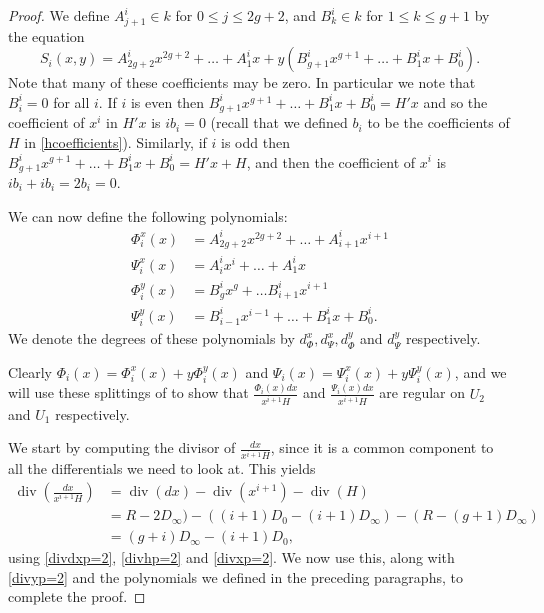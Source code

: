 \documentclass[draft, 11pt]{article} %
\theoremstyle{plain}
\theoremstyle{remark}
\DeclareMathOperator{\di}{div}
\begin{document}
\begin{proof}
We define $A^i_{j+1} \in k$ for $0 \leq j \leq 2g+2$, and $B_k^i \in k$ for $1\leq k \leq g+1$ by the equation
\[
S_i(x,y) = A_{2g+2}^ix^{2g+2} + \ldots + A^i_1 x + y(B_{g+1}^i x^{g+1} + \ldots + B_1^i x + B_0^i).
\]
Note that many of these coefficients may be zero.
In particular we note that $B_i^i = 0$ for all $i$.
If $i$ is even then $B_{g+1}^ix^{g+1} + \ldots + B_1^ix + B_0^i = H'x$ and so the coefficient of $x^i$ in $H'x$ is $ib_i = 0$ (recall that we defined $b_i$ to be the coefficients of $H$ in \eqref{hcoefficients}).
Similarly, if $i$ is odd then $B_{g+1}^ix^{g+1} + \ldots + B_1^ix + B_0^i = H'x + H$, and then the coefficient of $x^i$ is $ib_i+ ib_i = 2b_i = 0$.


We can now define the following polynomials:
\begin{equation}\label{Split}
\begin{split}
\Phi_i^x(x) & =  A^i_{2g+2}x^{2g+2} + \ldots + A^i_{i+1}x^{i+1} \\
\Psi_i^x(x) & =  A^i_ix^i + \ldots + A^i_1x \\
\Phi_i^y(x) & =  B_g^ix^g + \ldots B_{i+1}^ix^{i+1} \\
\Psi_i^y(x) & =  B_{i-1}^ix^{i-1} + \ldots + B_1^ix + B_0^i.
\end{split}
\end{equation}
We denote the degrees of these polynomials by $d_{\Phi}^x, d_{\Psi}^x, d_{\Phi}^y$ and $d_{\Psi}^y$ respectively.

Clearly $\Phi_i(x) = \Phi_i^x(x) + y\Phi_i^y(x)$ and $\Psi_i (x)= \Psi_i^x(x) + y\Psi_i^y(x)$, and we will use these splittings of to show that $\frac{ \Phi_i(x) dx}{x^{i+1}H}$ and $\frac{\Psi_i(x) dx}{x^{i+1}H}$ are regular on $U_2$ and $U_1$ respectively.

We start by computing the divisor of $\frac{dx}{x^{i+1}H}$, since it is a common component to all the differentials we need to look at.
This yields
\begin{align}
\di \left( \frac{dx}{x^{i+1}H} \right) & = \di(dx) - \di (x^{i+1}) - \di (H) \nonumber \\
& = R-2D_\infty) - ((i+1)D_0 - (i+1)D_\infty) - (R - (g+1)D_\infty) \nonumber \\
& = (g+i)D_\infty - (i+1)D_0,
\end{align}
using \eqref{divdxp=2}, \eqref{divhp=2} and \eqref{divxp=2}.
We now use this, along with \eqref{divyp=2} and the polynomials we defined in the preceding paragraphs, to complete the proof.


\end{proof}
\end{document}
